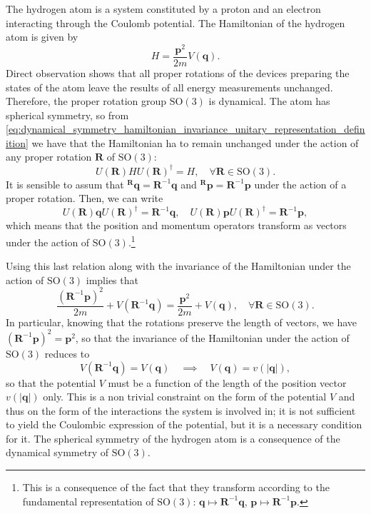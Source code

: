 \begin{example}
    The hydrogen atom is a system constituted by a proton and an electron interacting through the Coulomb potential. The Hamiltonian of the hydrogen atom is given by
    \[
        H = \frac{\mathbf{p}^2}{2m} V(\mathbf{q}).
    \]
    Direct observation shows that all proper rotations of the devices preparing the states of the atom leave the results of all energy measurements unchanged. Therefore, the proper rotation group \(\mathrm{SO}(3)\) is dynamical. The atom has spherical symmetry, so from \eqref{eq:dynamical_symmetry_hamiltonian_invariance_unitary_representation_definition} we have that the Hamiltonian ha to remain unchanged under the action of any proper rotation \(\mathbf{R}\) of \(\mathrm{SO}(3)\):
    \[
        U(\mathbf{R}) H U(\mathbf{R})^{\dagger} = H, \quad \forall \mathbf{R} \in \mathrm{SO}(3).
    \]
    It is sensible to assum that \(^{\mathbf{R}}\mathbf{q} = \mathbf{R}^{-1}\mathbf{q}\) and \(^{\mathbf{R}}\mathbf{p} = \mathbf{R}^{-1}\mathbf{p}\) under the action of a proper rotation. Then, we can write
    \[
        U(\mathbf{R}) \mathbf{q} U(\mathbf{R})^{\dagger} = \mathbf{R}^{-1}\mathbf{q}, \quad U(\mathbf{R}) \mathbf{p} U(\mathbf{R})^{\dagger} = \mathbf{R}^{-1}\mathbf{p},
    \]
    which means that the position and momentum operators transform as vectors under the action of \(\mathrm{SO}(3)\).\footnote{This is a consequence of the fact that they transform according to the fundamental representation of \(\mathrm{SO}(3)\): \(\mathbf{q} \mapsto \mathbf{R}^{-1}\mathbf{q}\), \(\mathbf{p} \mapsto \mathbf{R}^{-1}\mathbf{p}\).}

    Using this last relation along with the invariance of the Hamiltonian under the action of \(\mathrm{SO}(3)\) implies that
    \[
        \frac{(\mathbf{R}^{-1}\mathbf{p})^2}{2m} + V(\mathbf{R}^{-1}\mathbf{q}) = \frac{\mathbf{p}^2}{2m} + V(\mathbf{q}), \quad \forall \mathbf{R} \in \mathrm{SO}(3).
    \]
    In particular, knowing that the rotations preserve the length of vectors, we have \((\mathbf{R}^{-1}\mathbf{p})^2 = \mathbf{p}^2\), so that the invariance of the Hamiltonian under the action of \(\mathrm{SO}(3)\) reduces to
    \[
        V(\mathbf{R}^{-1} \mathbf{q}) = V(\mathbf{q}) \quad \implies \quad V(\mathbf{q}) = v(|\mathbf{q}|),
    \]
    so that the potential \(V\) must be a function of the length of the position vector \(v(|\mathbf{q}|)\) only. This is a non trivial constraint on the form of the potential \(V\) and thus on the form of the interactions the system is involved in; it is not sufficient to yield the Coulombic expression of the potential, but it is a necessary condition for it. The spherical symmetry of the hydrogen atom is a consequence of the dynamical symmetry of \(\mathrm{SO}(3)\).
\end{example}

\begin{example}

\end{example}

\begin{example}

\end{example}